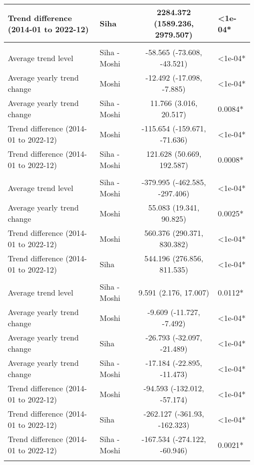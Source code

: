 \begin{longtable}{l|lcl}
Trend difference (2014-01 to 2022-12) & Siha & 2284.372 (1589.236, 2979.507) & <1e-04* \\ 
\midrule\addlinespace[2.5pt]
\multicolumn{4}{l}{Trauma} \\[2.5pt] 
\midrule\addlinespace[2.5pt]
Average trend level & Siha - Moshi & -58.565 (-73.608, -43.521) & <1e-04* \\ 
Average yearly trend change & Moshi & -12.492 (-17.098, -7.885) & <1e-04* \\ 
Average yearly trend change & Siha - Moshi & 11.766 (3.016, 20.517) & 0.0084* \\ 
Trend difference (2014-01 to 2022-12) & Moshi & -115.654 (-159.671, -71.636) & <1e-04* \\ 
Trend difference (2014-01 to 2022-12) & Siha - Moshi & 121.628 (50.669, 192.587) & 0.0008* \\ 
\midrule\addlinespace[2.5pt]
\multicolumn{4}{l}{Urinary Infections} \\[2.5pt] 
\midrule\addlinespace[2.5pt]
Average trend level & Siha - Moshi & -379.995 (-462.585, -297.406) & <1e-04* \\ 
Average yearly trend change & Moshi & 55.083 (19.341, 90.825) & 0.0025* \\ 
Trend difference (2014-01 to 2022-12) & Moshi & 560.376 (290.371, 830.382) & <1e-04* \\ 
Trend difference (2014-01 to 2022-12) & Siha & 544.196 (276.856, 811.535) & <1e-04* \\ 
\midrule\addlinespace[2.5pt]
\multicolumn{4}{l}{Vector-borne Infections} \\[2.5pt] 
\midrule\addlinespace[2.5pt]
Average trend level & Siha - Moshi & 9.591 (2.176, 17.007) & 0.0112* \\ 
Average yearly trend change & Moshi & -9.609 (-11.727, -7.492) & <1e-04* \\ 
Average yearly trend change & Siha & -26.793 (-32.097, -21.489) & <1e-04* \\ 
Average yearly trend change & Siha - Moshi & -17.184 (-22.895, -11.473) & <1e-04* \\ 
Trend difference (2014-01 to 2022-12) & Moshi & -94.593 (-132.012, -57.174) & <1e-04* \\ 
Trend difference (2014-01 to 2022-12) & Siha & -262.127 (-361.93, -162.323) & <1e-04* \\ 
Trend difference (2014-01 to 2022-12) & Siha - Moshi & -167.534 (-274.122, -60.946) & 0.0021* \\ 
\midrule\addlinespace[2.5pt]
\multicolumn{4}{l}{Malnutrition} \\[2.5pt] 

\end{longtable}

